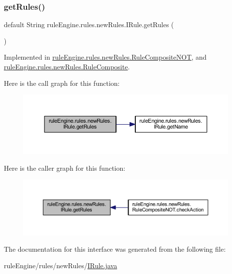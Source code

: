 \subsubsection{\texorpdfstring{get\+Rules()}{getRules()}}
{\footnotesize\ttfamily default String rule\+Engine.\+rules.\+new\+Rules.\+I\+Rule.\+get\+Rules (\begin{DoxyParamCaption}{ }\end{DoxyParamCaption})\hspace{0.3cm}{\ttfamily [inline]}}



Implemented in \mbox{\hyperlink{classrule_engine_1_1rules_1_1new_rules_1_1_rule_composite_n_o_t_ac462ba010b03ab7af8dfa25705127945}{rule\+Engine.\+rules.\+new\+Rules.\+Rule\+Composite\+N\+OT}}, and \mbox{\hyperlink{classrule_engine_1_1rules_1_1new_rules_1_1_rule_composite_a9b41dd74104e0fc2b8bf4f3d13a44f37}{rule\+Engine.\+rules.\+new\+Rules.\+Rule\+Composite}}.

Here is the call graph for this function\+:
\nopagebreak
\begin{figure}[H]
\begin{center}
\leavevmode
\includegraphics[width=350pt]{interfacerule_engine_1_1rules_1_1new_rules_1_1_i_rule_a9d1c8d3f07b6ade794f60453449486c0_cgraph}
\end{center}
\end{figure}
Here is the caller graph for this function\+:
\nopagebreak
\begin{figure}[H]
\begin{center}
\leavevmode
\includegraphics[width=350pt]{interfacerule_engine_1_1rules_1_1new_rules_1_1_i_rule_a9d1c8d3f07b6ade794f60453449486c0_icgraph}
\end{center}
\end{figure}


The documentation for this interface was generated from the following file\+:\begin{DoxyCompactItemize}
\item 
rule\+Engine/rules/new\+Rules/\mbox{\hyperlink{_i_rule_8java}{I\+Rule.\+java}}\end{DoxyCompactItemize}
